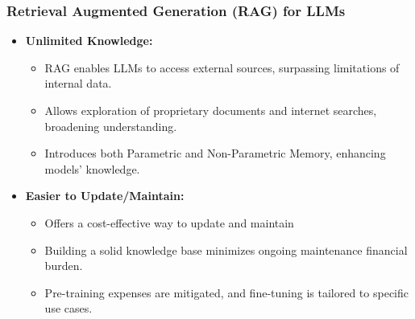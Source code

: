 




\begin{frame}[fragile]\frametitle{Retrieval Augmented Generation (RAG) for LLMs}
\begin{itemize}
  \item \textbf{Unlimited Knowledge:}
    \begin{itemize}
      \item RAG enables LLMs to access external sources, surpassing limitations of internal data.
      \item Allows exploration of proprietary documents and internet searches, broadening understanding.
      \item Introduces both Parametric and Non-Parametric Memory, enhancing models' knowledge.
    \end{itemize}
  
  \item \textbf{Easier to Update/Maintain:}
    \begin{itemize}
      \item Offers a cost-effective way to update and maintain %
      \item Building a solid knowledge base minimizes ongoing maintenance financial burden.
      \item Pre-training expenses are mitigated, and fine-tuning is tailored to specific use cases.
    \end{itemize}
\end{itemize}

\end{frame}

